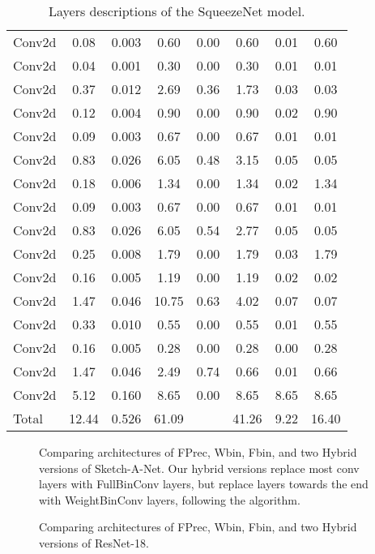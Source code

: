 \documentclass[10pt,twocolumn,letterpaper]{article}
\begin{document}
\begin{table}[]
{\begin{tabular}{|l|c|c|c|c|c|c|c|}
Conv2d & 0.08 & 0.003 & 0.60 & 0.00 & 0.60 & 0.01 & 0.60\\
Conv2d & 0.04 & 0.001 & 0.30 & 0.00 & 0.30 & 0.01 & 0.01\\
Conv2d & 0.37 & 0.012 & 2.69 & 0.36 & 1.73 & 0.03 & 0.03\\
Conv2d & 0.12 & 0.004 & 0.90 & 0.00 & 0.90 & 0.02 & 0.90\\
Conv2d & 0.09 & 0.003 & 0.67 & 0.00 & 0.67 & 0.01 & 0.01\\
Conv2d & 0.83 & 0.026 & 6.05 & 0.48 & 3.15 & 0.05 & 0.05\\
Conv2d & 0.18 & 0.006 & 1.34 & 0.00 & 1.34 & 0.02 & 1.34\\
Conv2d & 0.09 & 0.003 & 0.67 & 0.00 & 0.67 & 0.01 & 0.01\\
Conv2d & 0.83 & 0.026 & 6.05 & 0.54 & 2.77 & 0.05 & 0.05\\
Conv2d & 0.25 & 0.008 & 1.79 & 0.00 & 1.79 & 0.03 & 1.79\\
Conv2d & 0.16 & 0.005 & 1.19 & 0.00 & 1.19 & 0.02 & 0.02\\
Conv2d & 1.47 & 0.046 & 10.75 & 0.63 & 4.02 & 0.07 & 0.07\\
Conv2d & 0.33 & 0.010 & 0.55 & 0.00 & 0.55 & 0.01 & 0.55\\
Conv2d & 0.16 & 0.005 & 0.28 & 0.00 & 0.28 & 0.00 & 0.28\\
Conv2d & 1.47 & 0.046 & 2.49 & 0.74 & 0.66 & 0.01 & 0.66\\
Conv2d & 5.12 & 0.160 & 8.65 & 0.00 & 8.65 & 8.65 & 8.65\\
Total & 12.44 & 0.526 & 61.09 &  & 41.26 & 9.22 & 16.40\\
\hline
\end{tabular}}
\caption{Layers descriptions of the SqueezeNet model.}
\end{table}\cleardoublepage\begin{figure*}[t]
\caption{Comparing architectures of FPrec, Wbin, Fbin, and two Hybrid versions of Sketch-A-Net. Our hybrid versions replace most conv layers with FullBinConv layers, but replace layers towards the end with WeightBinConv layers, following the algorithm.}
\vspace*{-0.5cm}
\label{fig:sketchanet}
\end{figure*}\begin{figure*}[t]
\caption{Comparing architectures of FPrec, Wbin, Fbin, and two Hybrid versions of ResNet-18.}

\end{figure*}
\end{document}
